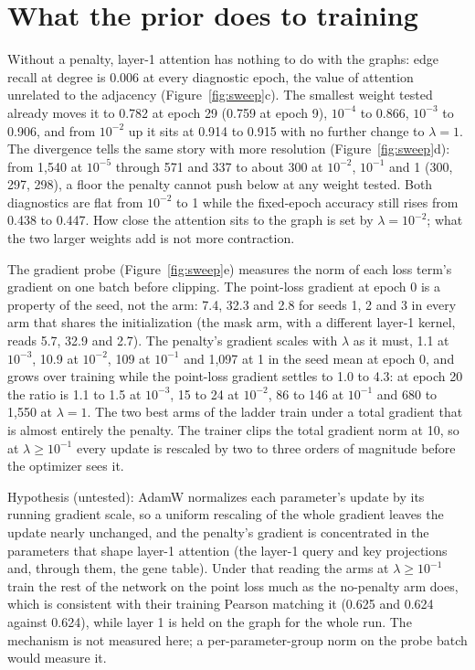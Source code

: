 
\section{What the prior does to training}
\label{sec:training}

Without a penalty, layer-1 attention has nothing to do with the graphs: edge recall at
degree is 0.006 at every diagnostic epoch, the value of attention unrelated to the
adjacency (Figure~\ref{fig:sweep}c). The smallest weight tested already moves it to
0.782 at epoch 29 (0.759 at epoch 9), $10^{-4}$ to 0.866, $10^{-3}$ to 0.906, and from
$10^{-2}$ up it sits at 0.914 to 0.915 with no further change to $\lambda = 1$. The
divergence tells the same story with more resolution (Figure~\ref{fig:sweep}d): from
1{,}540 at $10^{-5}$ through 571 and 337 to about 300 at $10^{-2}$, $10^{-1}$ and 1
(300, 297, 298), a floor the penalty cannot push below at any weight tested. Both
diagnostics are flat from $10^{-2}$ to 1 while the fixed-epoch accuracy still rises from
0.438 to 0.447. How close the attention sits to the graph is set by $\lambda = 10^{-2}$;
what the two larger weights add is not more contraction.

The gradient probe (Figure~\ref{fig:sweep}e) measures the norm of each loss term's
gradient on one batch before clipping. The point-loss gradient at epoch 0 is a property
of the seed, not the arm: 7.4, 32.3 and 2.8 for seeds 1, 2 and 3 in every arm that
shares the initialization (the mask arm, with a different layer-1 kernel, reads 5.7,
32.9 and 2.7). The penalty's gradient scales with $\lambda$ as it must, 1.1 at
$10^{-3}$, 10.9 at $10^{-2}$, 109 at $10^{-1}$ and 1{,}097 at 1 in the seed mean at
epoch 0, and grows over training while the point-loss gradient settles to 1.0 to 4.3:
at epoch 20 the ratio is 1.1 to 1.5 at $10^{-3}$, 15 to 24 at $10^{-2}$, 86 to 146 at
$10^{-1}$ and 680 to 1{,}550 at $\lambda = 1$. The two best arms of the ladder train
under a total gradient that is almost entirely the penalty. The trainer clips the total
gradient norm at 10, so at $\lambda \geq 10^{-1}$ every update is rescaled by two to
three orders of magnitude before the optimizer sees it.

Hypothesis (untested): AdamW normalizes each parameter's update by its running gradient
scale, so a uniform rescaling of the whole gradient leaves the update nearly unchanged,
and the penalty's gradient is concentrated in the parameters that shape layer-1
attention (the layer-1 query and key projections and, through them, the gene table).
Under that reading the arms at $\lambda \geq 10^{-1}$ train the rest of the network on
the point loss much as the no-penalty arm does, which is consistent with their training
Pearson matching it (0.625 and 0.624 against 0.624), while layer 1 is held on the graph
for the whole run. The mechanism is not measured here; a per-parameter-group norm on
the probe batch would measure it.

